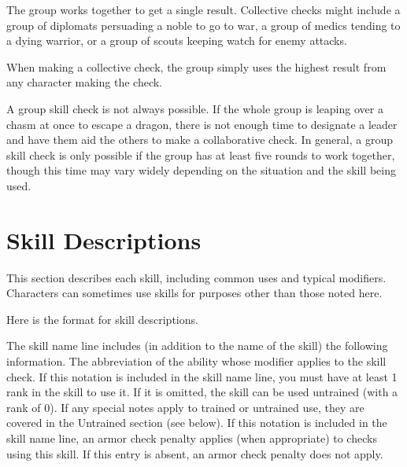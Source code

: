  The group works together to get a single result. Collective checks might include a group of diplomats persuading a noble to go to war, a group of medics tending to a dying warrior, or a group of scouts keeping watch for enemy attacks.

When making a collective check, the group simply uses the highest result from any character making the check.

 A group skill check is not always possible. If the whole group is leaping over a chasm at once to escape a dragon, there is not enough time to designate a leader and have them aid the others to make a collaborative check. In general, a group skill check is only possible if the group has at least five rounds to work together, though this time may vary widely depending on the situation and the skill being used.



\section{Skill Descriptions}
This section describes each skill, including common uses and typical modifiers. Characters can sometimes use skills for purposes other than those noted here.

Here is the format for skill descriptions.

The skill name line includes (in addition to the name of the skill) the following information.
 The abbreviation of the ability whose modifier applies to the skill check.
 If this notation is included in the skill name line, you must have at least 1 rank in the skill to use it. If it is omitted, the skill can be used untrained (with a rank of 0). If any special notes apply to trained or untrained use, they are covered in the Untrained section (see below).
 If this notation is included in the skill name line, an armor check penalty applies (when appropriate) to checks using this skill. If this entry is absent, an armor check penalty does not apply.


